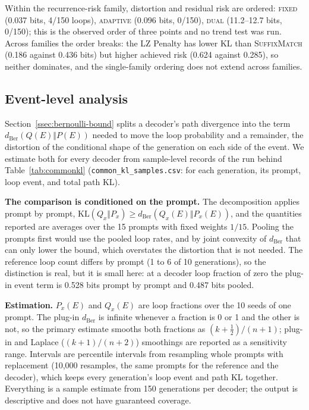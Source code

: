 \documentclass[11pt]{article}
\newcommand{\KL}{\mathrm{KL}}
\begin{document}
Within the recurrence-risk family, distortion and residual risk are ordered: \textsc{fixed} (0.037 bits, 4/150 loops), \textsc{adaptive} (0.096 bits, 0/150), \textsc{dual} (11.2--12.7 bits, 0/150); this is the observed order of three points and no trend test was run. Across families the order breaks: the LZ Penalty has lower KL than \textsc{SuffixMatch} (0.186 against 0.436 bits) but higher achieved risk (0.624 against 0.285), so neither dominates, and the single-family ordering does not extend across families.

\subsection{Event-level analysis}
\label{ssec:eventlevel}
Section~\ref{ssec:bernoulli-bound} splits a decoder's path divergence into the term $d_{\mathrm{Ber}}(Q(E)\Vert P(E))$ needed to move the loop probability and a remainder, the distortion of the conditional shape of the generation on each side of the event. We estimate both for every decoder from sample-level records of the run behind Table~\ref{tab:commonkl} (\texttt{common\_\allowbreak{}kl\_\allowbreak{}samples.csv}: for each generation, its prompt, loop event, and total path KL).

\textbf{The comparison is conditioned on the prompt.} The decomposition applies prompt by prompt, $\KL(Q_x\Vert P_x)\ge d_{\mathrm{Ber}}(Q_x(E)\Vert P_x(E))$, and the quantities reported are averages over the 15 prompts with fixed weights $1/15$. Pooling the prompts first would use the pooled loop rates, and by joint convexity of $d_{\mathrm{Ber}}$ that can only lower the bound, which overstates the distortion that is not needed. The reference loop count differs by prompt (1 to 6 of 10 generations), so the distinction is real, but it is small here: at a decoder loop fraction of zero the plug-in event term is 0.528 bits prompt by prompt and 0.487 bits pooled.

\textbf{Estimation.} $P_x(E)$ and $Q_x(E)$ are loop fractions over the 10 seeds of one prompt. The plug-in $d_{\mathrm{Ber}}$ is infinite whenever a fraction is 0 or 1 and the other is not, so the primary estimate smooths both fractions as $(k+\tfrac12)/(n+1)$; plug-in and Laplace ($(k+1)/(n+2)$) smoothings are reported as a sensitivity range. Intervals are percentile intervals from resampling whole prompts with replacement (10{,}000 resamples, the same prompts for the reference and the decoder), which keeps every generation's loop event and path KL together. Everything is a sample estimate from 150 generations per decoder; the output is descriptive and does not have guaranteed coverage.
\end{document}
